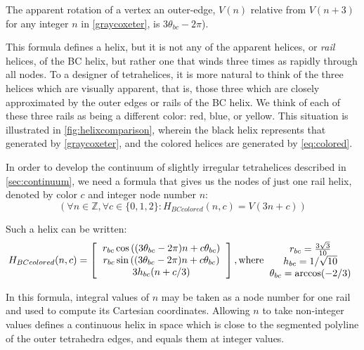 \documentclass[review]{siamonline1116}
\begin{document}
The apparent rotation of a vertex an outer-edge, $V(n)$ relative from $V(n+3)$ for any integer $n$
in \eqref{graycoxeter}, is $3 \theta_{bc} - 2\pi$).

This formula defines a helix, but it is not any of the apparent helices, or \emph{rail} helices, of the
BC helix, but rather one that winds three times as rapidly through all
nodes. To a designer of tetrahelices, it is more natural to think of
the three helices which are visually apparent, that is, those three
which are closely approximated by the outer edges or rails of
the BC helix. We think of each of these three rails as being a different color: red, blue, or yellow.
This situation is illustrated in \cref{fig:helixcomparison}, wherein the black helix represents that
generated by \cref{graycoxeter},
and the colored helices are generated by \cref{eq:colored}. 



In order to develop the continuum of slightly irregular tetrahelices described in \cref{sec:continuum},
we need a formula that gives us the nodes of just
one rail helix, denoted by color $c$ and integer node number $n$:
\[
(\forall n \in \mathbb{Z}, \forall c \in \{0,1,2\} : H_{BCcolored}(n,c) = V(3n +c))
\]

Such a helix can be written:
\begin{equation}
  \label{eq:colored}
H_{BCcolored}(n,c) =
\left [
  \begin{tabular}{c}
   $ r_{bc}  \cos{((3 \theta_{bc} - 2 \pi)n + c  \theta_{bc})}  $\\
   $ r_{bc} \sin{((3 \theta_{bc} - 2 \pi)n + c  \theta_{bc})} $\\
   $ 3 h_{bc} (n + c/3)  $
  \end{tabular}
  \right ],
\text{where}
  \begin{tabular}{c}
 $ r_{bc} = \frac{3\sqrt{3}}{10} $\\
 $ h_{bc} = 1/\sqrt{10} $ \\
 $ \theta_{bc} = \arccos(-2/3) $ \\
  \end{tabular}      
\end{equation}

In this formula, integral values of $n$ may be taken as a node number for one rail and used to compute its Cartesian
coordinates. Allowing $n$ to take non-integer values defines a continuous
helix in space which is close to the segmented polyline of the outer tetrahedra edges, and equals them at integer
values.
\end{document}
